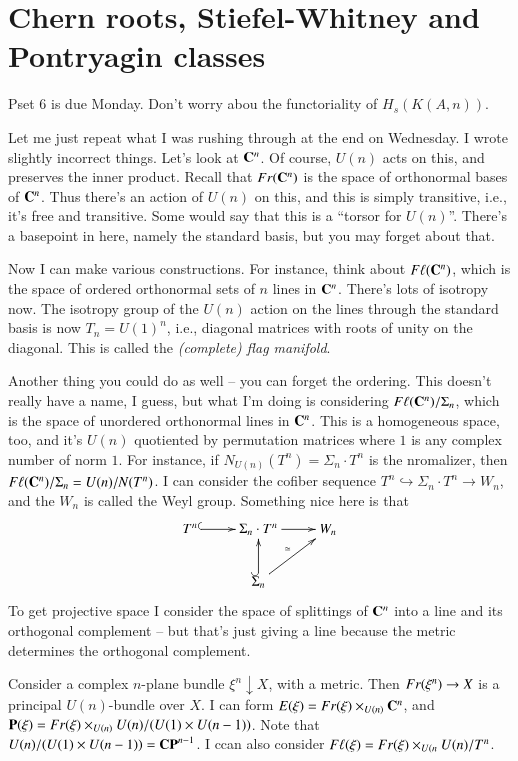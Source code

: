 \section{Chern roots, Stiefel-Whitney and Pontryagin classes}
Pset 6 is due Monday.
Don't worry abou the functoriality of $H_s(K(A,n))$.

Let me just repeat what I was rushing through at the end on Wednesday.
I wrote slightly incorrect things.
Let's look at $\mathbf C^n$.
Of course, $U(n)$ acts on this, and preserves the inner product.
Recall that $Fr(\mathbf C^n)$ is the space of orthonormal bases of $\mathbf C^n$.
Thus there's an action of $U(n)$ on this, and this is simply transitive, i.e., it's free and transitive.
Some would say that this is a ``torsor for $U(n)$''.
There's a basepoint in here, namely the standard basis, but you may forget about that.

Now I can make various constructions.
For instance, think about $F\ell(\mathbf C^n)$, which is the space of ordered orthonormal sets of $n$ lines in $\mathbf C^n$.
There's lots of isotropy now.
The isotropy group of the $U(n)$ action on the lines through the standard basis is now $T_n=U(1)^n$, i.e., diagonal matrices with roots of unity on the diagonal.
This is called the \emph{(complete) flag manifold}.

Another thing you could do as well -- you can forget the ordering.
This doesn't really have a name, I guess, but what I'm doing is considering $F\ell(\mathbf C^n)/\Sigma_n$, which is the space of unordered orthonormal lines in $\mathbf C^n$.
This is a homogeneous space, too, and it's $U(n)$ quotiented by permutation matrices where $1$ is any complex number of norm $1$.
For instance, if $N_{U(n)}(T^n) = \Sigma_n\cdot T^n$ is the nromalizer, then $F\ell(\mathbf C^n)/\Sigma_n = U(n)/N(T^n)$.
I can consider the cofiber sequence $T^n\hookrightarrow \Sigma_n\cdot T^n \to W_n$, and the $W_n$ is called the Weyl group.
Something nice here is that
\begin{equation*}
    \xymatrix{
	T^n\ar@{^(->}[r] & \Sigma_n\cdot T^n\ar[r] & W_n\\
	& \Sigma_n\ar@{^(->}[u]\ar[ur]^\simeq & 
    }
\end{equation*}
To get projective space I consider the space of splittings of $\mathbf C^n$ into a line and its orthogonal complement -- but that's just giving a line because the metric determines the orthogonal complement.

Consider a complex $n$-plane bundle $\xi^n\downarrow X$, with a metric.
Then $Fr(\xi^n)\to X$ is a principal $U(n)$-bundle over $X$.
I can form $E(\xi) = Fr(\xi)\times_{U(n)}\mathbf C^n$, and $\mathbf P(\xi) = Fr(\xi)\times_{U(n)} U(n)/(U(1)\times U(n-1))$.
Note that $U(n)/(U(1)\times U(n-1)) = \mathbf{CP}^{n-1}$.
I ccan also consider $F\ell(\xi) = Fr(\xi)\times_{U(n} U(n)/T^n$.

